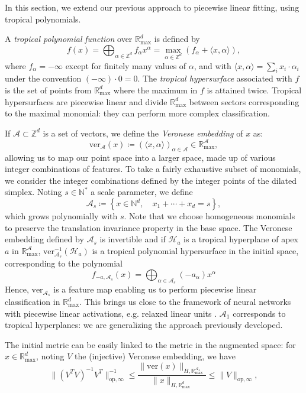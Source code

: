 \documentclass[oneside,UKenglish,a4paper]{amsart}
\numberwithin{equation}{section}
\numberwithin{figure}{section}
\theoremstyle{plain}
\theoremstyle{definition}
\theoremstyle{plain}
\theoremstyle{remark}
\theoremstyle{plain}
\theoremstyle{definition}
\theoremstyle{definition}
\begin{document}
In this section, we extend our previous approach to piecewise linear
fitting, using tropical polynomials. 

A \emph{tropical polynomial} \emph{function} over $\mathbb{R}_{\max}^{d}$
is defined by
\[
f(x)=\bigoplus_{\alpha\in\mathbb{Z}^{d}}f_{\alpha}x^{\alpha}=\max_{\alpha\in\mathbb{Z}^{d}}\left(f_{\alpha}+\langle x,\alpha\rangle\right),
\]
where $f_{\alpha}=-\infty$ except for finitely many values of $\alpha$,
and with $\langle x,\alpha\rangle=\sum_{i}x_{i}\cdot\alpha_{i}$ under
the convention $(-\infty)\cdot0=0$. The \emph{tropical hypersurface} associated with $f$ is the set of points from
$\mathbb{R}_{\max}^{d}$ where the maximum in $f$ is attained twice.
Tropical hypersurfaces are piecewise linear and divide $\mathbb{R}_{\max}^{d}$
between sectors corresponding to the maximal monomial: they can perform
more complex classification.

If $\mathcal{A}\subset\mathbb{Z}^{d}$ is a set of vectors, we define
the \emph{Veronese embedding} of $x$ as:
\[
\text{ver}_{\mathcal{A}}(x)\coloneqq\left(\langle x,\alpha\rangle\right)_{\alpha\in\mathcal{A}}\in\mathbb{R}_{\max}^{\mathcal{A}},
\]
allowing us to map our point space into a larger space, made up of
various integer combinations of features. To take a fairly exhaustive
subset of monomials, we consider the integer combinations defined
by the integer points of the dilated simplex. Noting $s\in\mathbb{N}^{*}$
a scale parameter, we define
\[
\mathcal{A}_{s}\coloneqq\left\{x\in\mathbb{N}^{d},\quad x_{1}+\cdots+x_{d}=s\right\},
\]
which grows polynomially with $s$. Note that we choose homogeneous monomials to preserve the translation invariance property in the base space. The Veronese embedding defined
by $\mathcal{A}_{s}$ is invertible and if $\mathcal{H}_a$ is a tropical
hyperplane of apex $a$ in $\mathbb{R}_{\max}^{\mathcal{A}}$, $\text{ver}_{\mathcal{A}_{s}}^{-1}(\mathcal{H}_a)$
is a tropical polynomial hypersurface in the initial space, corresponding to the polynomial
\[ f_{-a, \mathcal{A}_s}(x)=\bigoplus_{\alpha\in \mathcal{A}_s} (-a_\alpha)x^\alpha \]
Hence, $\text{ver}_{\mathcal{A}_{s}}$ is a feature map
enabling us to perform piecewise linear classification in $\mathbb{R}_{\max}^{d}$. This brings us close to the framework of neural networks with piecewise linear activations, e.g. relaxed linear units \cite{zhang2018tropical}. $\mathcal{A}_1$ corresponds to tropical hyperplanes: we are generalizing the approach previously developed.

The initial metric can be easily linked to the metric in the augmented space: for $x\in\mathbb{R}_{\max}^d$, noting $V$ the (injective) Veronese embedding, we have
\[
\lVert (V^TV)^{-1} V^T \rVert_{\text{op},\infty}^{-1} \le \frac{\lVert\text{ver}(x)\rVert_{H,\mathbb{R}^{\mathcal{A}_s}_{\max}}}{\lVert x\rVert_{H,\mathbb{R}_{\max}^d}} \le \lVert V \rVert_{\text{op},\infty},
\]
\end{document}
